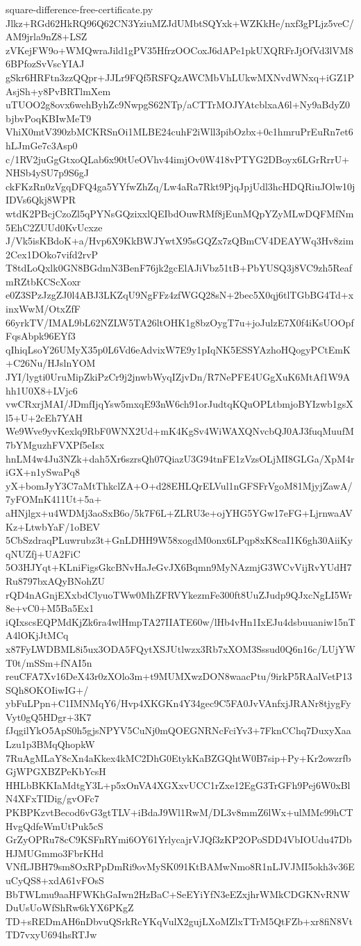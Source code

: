 \documentclass[11pt]{article}
\theoremstyle{definition}
\theoremstyle{remark}
\begin{document}
\begin{filecontents*}[overwrite]{square-difference-free-certificate.py}
Jlkz+RGd62HkRQ96Q62CN3YziuMZJdUMbtSQYxk+WZKkHe/nxf3gPLjz5veC/AM9jrla9nZ8+LSZ
zVKejFW9o+WMQwraJild1gPV35HfrzOOCoxJ6dAPe1pkUXQRFrJjOfVd3lVM86BPfozSvVscYIAJ
gSkr6HRFtn3zzQQpr+JJLr9FQf5RSFQzAWCMbVhLUkwMXNvdWNxq+iGZ1PAsjSh+y8PvBRTlmXem
uTUOO2g8ovx6wehByhZc9NwpgS62NTp/aCTTrMOJYAtcblxaA6l+Ny9aBdyZ0bjbvPoqKBIwMeT9
VhiX0mtV390zbMCKRSnOi1MLBE24cuhF2iWll3pibOzbx+0c1hmruPrEuRn7et6hLJmGe7c3Asp0
c/1RV2juGgGtxoQLab6x90tUeOVhv44imjOv0W418vPTYG2DBoyx6LGrRrrU+NHSb4ySU7p9S6gJ
ckFKzRn0zVgqDFQ4ga5YYfwZhZq/Lw4aRa7Rkt9PjqJpjUdl3hcHDQRiuJOlw10jIDVs6Qkj8WPR
wtdK2PBcjCzoZl5qPYNsGQzixxlQEIbdOuwRMf8jEunMQpYZyMLwDQFMfNm5EhC2ZUUd0KvUcxze
J/Vk5isKBdoK+a/Hvp6X9KkBWJYwtX95sGQZx7zQBmCV4DEAYWq3Hv8zim2Cex1DOko7vifd2rvP
T8tdLoQxlk0GN8BGdmN3BenF76jk2gcElAJiVbz51tB+PbYUSQ3j8VC9zh5ReafmRZtbKCScXoxr
e0Z3SPzJzgZJ0l4ABJ3LKZqU9NgFFz4zfWGQ28sN+2bec5X0qj6tlTGbBG4Td+xinxWwM/OtxZfF
66yrkTV/IMAL9bL62NZLW5TA26ltOHK1g8bzOygT7u+joJulzE7X0f4iKsUOOpfFqsAbpk96EYf3
qIhiqLsoY26UMyX35p0L6Vd6eAdvixW7E9y1pIqNK5ESSYAzhoHQogyPCtEmK+C26Nu/HJslnYOM
JYI/lygti0UruMipZkiPzCr9j2jnwbWyqIZjvDn/R7NePFE4UGgXuK6MtAf1W9Ahh1U0X8+LVjc6
vwCRxrjMAI/JDmfIjqYsw5mxqE93nW6ch91orJudtqKQuOPLtbmjoBYIzwb1gsXl5+U+2cEh7YAH
We9Wve9yvKexlq9RbF0WNX2Ud+mK4KgSv4WiWAXQNvcbQJ0AJ3fuqMuufM7bYMguzhFVXPf5eIsx
hnLM4w4Ju3NZk+dah5Xr6szrsQh07QiazU3G94tnFE1zVzsOLjMI8GLGa/XpM4riGX+n1ySwaPq8
yX+bomJyY3C7aMtThkclZA+O+d28EHLQrELVul1nGFSFrVgoM81MjyjZawA/7yFOMnK411Ut+5a+
aHNjlgx+u4WDMj3aoSxB6o/5k7F6L+ZLRU3e+ojYHG5YGw17eFG+LjrnwaAVKz+LtwbYaF/1oBEV
5CbSzdraqPLuwrubz3t+GnLDHH9W58xogdM0onx6LPqp8xK8caI1K6gh30AiiKyqNUZfj+UA2FiC
5O3HJYqt+KLniFigsGkcBNvHaJeGvJX6Bqmn9MyNAzmjG3WCvVijRvYUdH7Ru8797bxAQyBNohZU
rQD4nAGnjEXxbdClyuoTWw0MhZFRVYkezmFe300ft8UuZJudp9QJxcNgLI5Wr8e+vC0+M5Ba5Ex1
iQIxscsEQPMdKjZk6ra4wlHmpTA27IIATE60w/lHb4vHn1IxEJu4dsbuuaniw15nTA4lOKjJtMCq
x87FyLWDBML8i5ux3ODA5FQytXSJUtlwzx3Rb7xXOM3Sssud0Q6n16c/LUjYWT0t/mSSm+fNAI5n
reuCFA7Xv16DeX43r0zXOlo3m+t9MUMXwzDON8waacPtu/9irkP5RAalVetP13SQh8OKOIiwIG+/
ybFuLPpn+C1IMNMqY6/Hvp4XKGKn4Y34gec9C5FA0JvVAnfxjJRANr8tjygFyVyt0gQ5HDgr+3K7
fJqgilYkO5ApS0h5gjsNPYV5CuNj0mQOEGNRNcFciYv3+7FknCChq7DuxyXaaLzu1p3BMqQhopkW
7RuAgMLaY8cXn4aKkex4kMC2DhG0EtykKaBZGQhtW0B7sip+Py+Kr2owzrfbGjWPGXBZPeKbYcsH
HHLbBKKIaMdtgY3L+p5xOnVA4XGXxvUCC1rZxe12EgG3TrGFh9Pej6W0xBlN4XFxTIDig/gvOFc7
PKBPKzvtBecod6vG3gtTLV+iBdaJ9Wl1RwM/DL3v8mmZ6lWx+ulMMc99hCTHvgQdfeWmUtPuk5cS
GrZyOPRu78cC9KSFnRYmi6OY61YrlycajrVJQf3zKP2OPoSDD4VbIOUdu47DbHJMUGmmo3FbrKHd
VNfLJBH79sm8OxRPpDmRi9ovMySK091KtBAMwNmo8R1nLJVJMI5okh3v36EuCyQS8+xdA61vFOsS
BbTWLmu9aaHFWKhGaIwn2HzBaC+SeEYiYfN3eEZxjhrWMkCDGKNvRNWDuUsUoWfShRw6kYX6PKgZ
TD+sREDmAH6nDbvuQSrkRcYKqVulX2gujLXoMZlxTTrM5QtFZb+xr8fiN8VtTD7vxyU694hsRTJw

\end{filecontents*}
\end{document}
